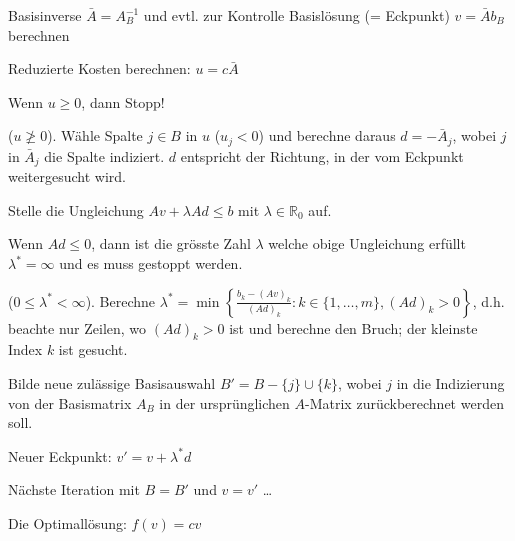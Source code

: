 \begin{aufzaehlung}
        \begin{aufzaehlung}
          \item Basisinverse $\bar{A} = A_B^{-1}$ und evtl. zur Kontrolle Basislösung (= Eckpunkt) $v = \bar{A} b_B$ berechnen
          \item Reduzierte Kosten berechnen: $u = c \bar{A}$
          \item Wenn $u \geq 0$, dann Stopp!
          \item ($u \ngeq 0$). Wähle Spalte $j \in B$ in $u$ ($u_j < 0$) und berechne daraus 
            $d = - \bar{A}_j$, wobei $j$ in $\bar{A}_j$ die Spalte indiziert. $d$ entspricht der 
            Richtung, in der vom Eckpunkt weitergesucht wird.
          \item Stelle die Ungleichung $A v + \lambda A d \leq b$ mit $\lambda \in \mathbb{R}_0$ auf.
          \item Wenn $Ad \leq 0$, dann ist die grösste Zahl $\lambda$ welche obige Ungleichung erfüllt
            $\lambda^* = \infty$ und es muss gestoppt werden.
          \item ($0 \leq \lambda^* < \infty$). Berechne 
            $\lambda^* = \min \left\{ \frac{b_k - (Av)_k}{(Ad)_k} : k \in \{1,\ldots,m\}, (Ad)_k > 0 \right\}$,
            d.h. beachte nur Zeilen, wo $(Ad)_k > 0$ ist und berechne den Bruch; der kleinste Index $k$ 
            ist gesucht.
          \item Bilde neue zulässige Basisauswahl $B' = B - \{j\} \cup \{k\}$, wobei $j$ in die 
            Indizierung von der Basismatrix $A_B$ in der ursprünglichen $A$-Matrix zurückberechnet
            werden soll.
          \item Neuer Eckpunkt: $v' = v + \lambda^* d$
          \item Nächste Iteration mit $B = B'$ und $v = v'$ \ldots
        \end{aufzaehlung}
      \item Die Optimallösung: $f(v) = cv$
  \end{aufzaehlung}
  
